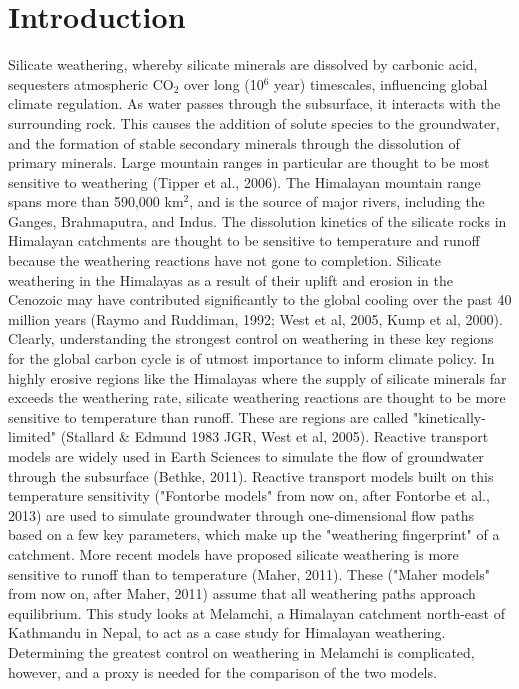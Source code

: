 
\section{Introduction}

Silicate weathering, whereby silicate minerals are dissolved by carbonic acid, sequesters atmospheric CO$_2$ over long (10$^6$ year) timescales, influencing global climate regulation. As water passes through the subsurface, it interacts with the surrounding rock. This causes the addition of solute species to the groundwater, and the formation of stable secondary minerals through the dissolution of primary minerals. Large mountain ranges in particular are thought to be most sensitive to weathering (Tipper et al., 2006). The Himalayan mountain range spans more than 590,000 km$^2$, and is the source of major rivers, including the Ganges, Brahmaputra, and Indus. The dissolution kinetics of the silicate rocks in Himalayan catchments are thought to be sensitive to temperature and runoff because the weathering reactions have not gone to completion. Silicate weathering in the Himalayas as a result of their uplift and erosion in the Cenozoic may have contributed significantly to the global cooling over the past 40 million years (Raymo and Ruddiman, 1992; West et al, 2005, Kump et al, 2000). Clearly, understanding the strongest control on weathering in these key regions for the global carbon cycle is of utmost importance to inform climate policy. In highly erosive regions like the Himalayas where the supply of silicate minerals far exceeds the weathering rate, silicate weathering reactions are thought to be more sensitive to temperature than runoff. These are regions are called "kinetically-limited" (Stallard \& Edmund 1983 JGR, West et al, 2005). Reactive transport models are widely used in Earth Sciences to simulate the flow of groundwater through the subsurface (Bethke, 2011). Reactive transport models built on this temperature sensitivity ("Fontorbe models" from now on, after Fontorbe et al., 2013) are used to simulate groundwater through one-dimensional flow paths based on a few key parameters, which make up the "weathering fingerprint" of a catchment. More recent models have proposed silicate weathering is more sensitive to runoff than to temperature (Maher, 2011). These ("Maher models" from now on, after Maher, 2011) assume that all weathering paths approach equilibrium. This study looks at Melamchi, a Himalayan catchment north-east of Kathmandu in Nepal, to act as a case study for Himalayan weathering. Determining the greatest control on weathering in Melamchi is complicated, however, and a proxy is needed for the comparison of the two models.


